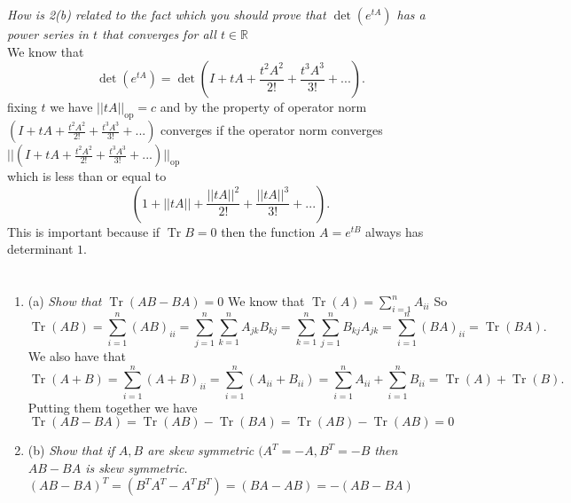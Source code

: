 \documentclass{article}
\begin{document}
    \section{}
    \emph{How is 2(b) related to the fact which you should prove that $\det(e^{tA})$ has a
    power series in $t$ that converges for all $t \in \mathbb{R} $ }
    \\
    We know that 
    \[
    \det(e^{tA}) = \det(I+tA + \frac{t^2A^2}{2!} + \frac{t^{3}A^{3}}{3!}+...)
    .\] 
    fixing $t$ we have  $||tA||_{\text{op}} = c$ and by the property of operator norm
    $(I+tA + \frac{t^2A^2}{2!} + \frac{t^{3}A^{3}}{3!}+...)$ converges if the operator norm converges $|| (I+tA + \frac{t^2A^2}{2!} + \frac{t^{3}A^{3}}{3!}+...)||_{\text{op}}$\\
    which is less than or equal to 
    \[
    (1+||tA|| + \frac{||tA||^2}{2!} + \frac{||tA||^{3}}{3!}+...) 
    .\] 
    This is important because if $\operatorname{Tr}B = 0$ then the function $A = e^{tB}$ always has determinant $1$.



    \section{}
    \begin{enumerate}
        \item (a)
            \emph{Show that $\operatorname{Tr}(AB-BA) = 0$ }
            We know that $\operatorname{Tr}(A) = \sum_{i=1}^{n}A_{ii}$
            So
            \[
                \operatorname{Tr}(AB) = \sum_{i=1}^{n}(AB)_{ii} = \sum_{j=1}^{n}\sum_{k=1}^{n}A_{jk}B_{kj} = \sum_{k=1}^{n}\sum_{j=1}^{n}B_{kj}A_{jk}
                = \sum_{i=1}^{n}(BA)_{ii} = \operatorname{Tr}(BA)
            .\] 
            We also have that
            \[
                \operatorname{Tr}(A+B) = \sum_{i=1}^{n}(A+B)_{ii} = \sum_{i=1}^{n}(A_{ii} + B_{ii}) = \sum_{i=1}^{n}A_{ii} + \sum_{i=1}^{n}B_{ii} = \operatorname{Tr}(A) + \operatorname{Tr}(B)
            .\] 
            Putting them together we have $\operatorname{Tr}(AB-BA) = \operatorname{Tr}(AB) - \operatorname{Tr}(BA) = \operatorname{Tr}(AB) - \operatorname{Tr}(AB) = 0$
        \item (b)
            \emph{Show that if $A,B$ are skew symmetric $(A^{T} = -A, B^{T} = -B$ then $AB - BA$ is skew symmetric.}\\
            $(AB-BA)^{T} = (B^{T}A^{T}-A^{T}B^{T}) = (BA-AB) = -(AB-BA)$

    \end{enumerate}
    
\end{document}
